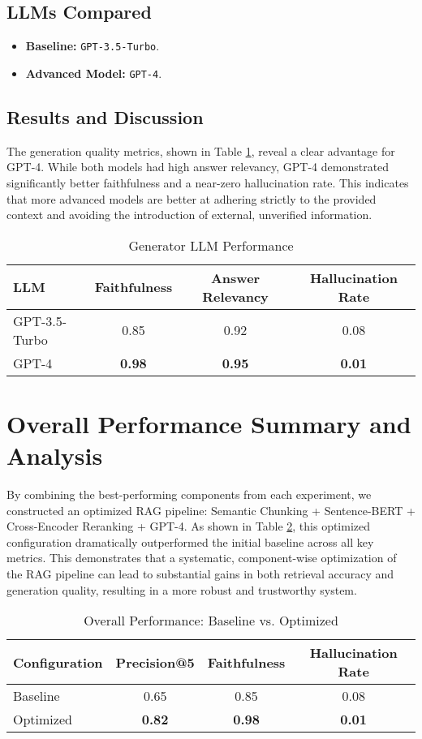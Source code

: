 \subsection{LLMs Compared}
\begin{itemize}
    \item \textbf{Baseline:} \texttt{GPT-3.5-Turbo}.
    \item \textbf{Advanced Model:} \texttt{GPT-4}.
\end{itemize}
\subsection{Results and Discussion}
The generation quality metrics, shown in Table \ref{tab:llm_results}, reveal a clear advantage for GPT-4. While both models had high answer relevancy, GPT-4 demonstrated significantly better faithfulness and a near-zero hallucination rate. This indicates that more advanced models are better at adhering strictly to the provided context and avoiding the introduction of external, unverified information.

\begin{table}[h!]
\centering
\caption{Generator LLM Performance}
\label{tab:llm_results}
\begin{tabular}{|l|c|c|c|}
\hline
\textbf{LLM} & \textbf{Faithfulness} & \textbf{Answer Relevancy} & \textbf{Hallucination Rate} \\
\hline
GPT-3.5-Turbo & 0.85 & 0.92 & 0.08 \\
GPT-4 & \textbf{0.98} & \textbf{0.95} & \textbf{0.01} \\
\hline
\end{tabular}
\end{table}

\section{Overall Performance Summary and Analysis}
\label{sec:overall_analysis}
By combining the best-performing components from each experiment, we constructed an optimized RAG pipeline: Semantic Chunking + Sentence-BERT + Cross-Encoder Reranking + GPT-4. As shown in Table \ref{tab:overall_results}, this optimized configuration dramatically outperformed the initial baseline across all key metrics. This demonstrates that a systematic, component-wise optimization of the RAG pipeline can lead to substantial gains in both retrieval accuracy and generation quality, resulting in a more robust and trustworthy system.

\begin{table}[h!]
\centering
\caption{Overall Performance: Baseline vs. Optimized}
\label{tab:overall_results}
\begin{tabular}{|l|c|c|c|}
\hline
\textbf{Configuration} & \textbf{Precision@5} & \textbf{Faithfulness} & \textbf{Hallucination Rate} \\
\hline
Baseline & 0.65 & 0.85 & 0.08 \\
Optimized & \textbf{0.82} & \textbf{0.98} & \textbf{0.01} \\
\hline
\end{tabular}
\end{table}
